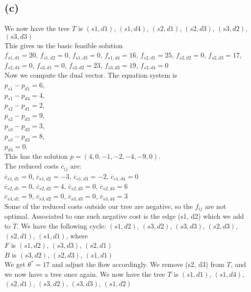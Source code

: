 \documentclass{article}
\theoremstyle{definition}
\begin{document}
\subsection*{(c)}
We now have the tree $T$ is $(s1, d1)$, $(s1, d4)$, $(s2, d1)$, $(s2, d3)$, $(s3, d2)$, $(s3, d3)$ \\
This gives us the basic feasible solution \\
$f_{s1,d1} = 20$, $f_{s1,d2} = 0$, $f_{s1,d3} = 0$, $f_{s1,d4} = 16$, $f_{s2,d1} = 25$, $f_{s2,d2} = 0$, $f_{s2,d3} = 17$, $f_{s2,d4} = 0$, $f_{s3,d1} = 0$, $f_{s3,d2} = 23$, $f_{s3,d3} = 19$, $f_{s3,d4} = 0$ \\
Now we compute the dual vector. The equation system is \\
$p_{s1} - p_{d1} = 6$, \\
$p_{s1} - p_{d4} = 4$, \\
$p_{s2} - p_{d1} = 2$, \\
$p_{s2} - p_{d3} = 9$, \\
$p_{s3} - p_{d2} = 3$, \\
$p_{s3} - p_{d3} = 8$, \\
$p_{d4} = 0$. \\
This has the solution $p = (4, 0, -1, -2, -4, -9, 0)$. \\
The reduced costs $\overline{{c}}_{{ij}}$ are: \\
$\overline{c}_{s1,d1} = 0$, $\overline{c}_{s1,d2} = -3$, $\overline{c}_{s1,d3} = -2$, $\overline{c}_{s1,d4} = 0$ \\ 
$\overline{c}_{s2,d1} = 0$, $\overline{c}_{s2,d2} = 4$, $\overline{c}_{s2,d3} = 0$, $\overline{c}_{s2,d4} = 6$ \\ 
$\overline{c}_{s3,d1} = 9$, $\overline{c}_{s3,d2} = 0$, $\overline{c}_{s3,d3} = 0$, $\overline{c}_{s3,d4} = 3$ \\
Some of the reduced costs outside our tree are negative, so the $f_{{ij}}$ are not optimal.
Associated to one such negative cost is the edge (s1, d2) which we add to $T$.
We have the following cycle: $(s1, d2)$, $(s3, d2)$, $(s3, d3)$, $(s2, d3)$, $(s2, d1)$, $(s1, d1)$, where \\
$F$ is $(s1, d2)$, $(s3, d3)$, $(s2, d1)$ \\
$B$ is $(s3, d2)$, $(s2, d3)$, $(s1, d1)$ \\
We get $\theta^* = 17$ and adjust the flow accordingly.
We remove (s2, d3) from $T$, and we now have a tree once again.
We now have the tree $T$ is $(s1, d1)$, $(s1, d4)$, $(s2, d1)$, $(s3, d2)$, $(s3, d3)$, $(s1, d2)$ \\
\end{document}
